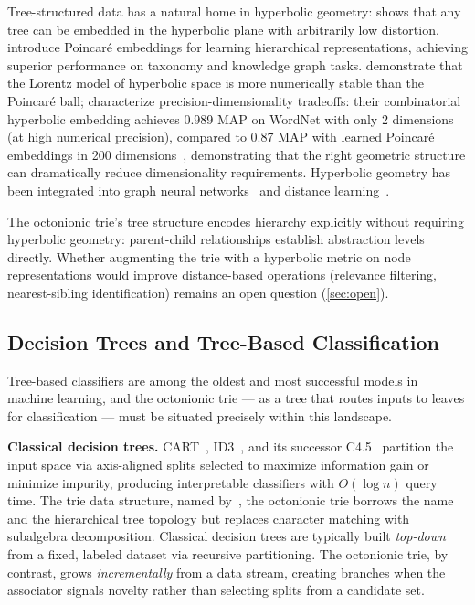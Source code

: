 \documentclass[11pt,a4paper]{article}
\theoremstyle{definition}
\theoremstyle{remark}
\begin{document}
Tree-structured data has a natural home in hyperbolic geometry: \citet{Sarkar2011} shows that any tree can be embedded in the hyperbolic plane with arbitrarily low distortion. \citet{Nickel2017} introduce Poincar\'{e} embeddings for learning hierarchical representations, achieving superior performance on taxonomy and knowledge graph tasks. \citet{NickelKiela2018} demonstrate that the Lorentz model of hyperbolic space is more numerically stable than the Poincar\'{e} ball; \citet{Sala2018} characterize precision-dimensionality tradeoffs: their combinatorial hyperbolic embedding achieves 0.989 MAP on WordNet with only 2 dimensions (at high numerical precision), compared to 0.87 MAP with learned Poincar\'{e} embeddings in 200 dimensions~\citep{Nickel2017}, demonstrating that the right geometric structure can dramatically reduce dimensionality requirements. Hyperbolic geometry has been integrated into graph neural networks~\citep{Chami2019} and distance learning~\citep{Law2019}.

The octonionic trie's tree structure encodes hierarchy explicitly without requiring hyperbolic geometry: parent-child relationships establish abstraction levels directly. Whether augmenting the trie with a hyperbolic metric on node representations would improve distance-based operations (relevance filtering, nearest-sibling identification) remains an open question (\cref{sec:open}).

\subsection{Decision Trees and Tree-Based Classification}

Tree-based classifiers are among the oldest and most successful models in machine learning, and the octonionic trie --- as a tree that routes inputs to leaves for classification --- must be situated precisely within this landscape.

\textbf{Classical decision trees.} CART~\citep{Breiman1984}, ID3~\citep{Quinlan1986}, and its successor C4.5~\citep{Quinlan1993} partition the input space via axis-aligned splits selected to maximize information gain or minimize impurity, producing interpretable classifiers with $O(\log n)$ query time. The trie data structure, named by~\citet{Fredkin1960}, the octonionic trie borrows the name and the hierarchical tree topology but replaces character matching with subalgebra decomposition. Classical decision trees are typically built \emph{top-down} from a fixed, labeled dataset via recursive partitioning. The octonionic trie, by contrast, grows \emph{incrementally} from a data stream, creating branches when the associator signals novelty rather than selecting splits from a candidate set.
\end{document}
